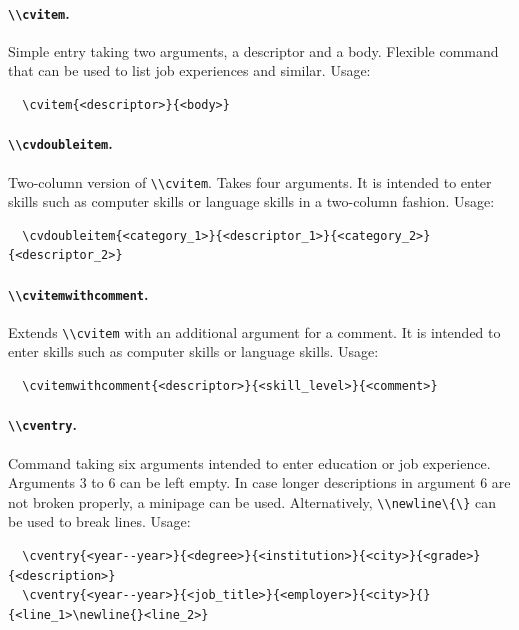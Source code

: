 \documentclass[a4paper, 11pt]{article}
\newcommand{\code}[1]{\lstinline!#1!}
\begin{document}
\paragraph{\code{\\cvitem}.}
Simple entry taking two arguments, a descriptor and a body.
Flexible command that can be used to list job experiences and similar.
Usage:
\begin{lstlisting}
  \cvitem{<descriptor>}{<body>}
\end{lstlisting}

\paragraph{\code{\\cvdoubleitem}.}
Two-column version of \code{\\cvitem}.
Takes four arguments.
It is intended to enter skills such as computer skills or language skills in a two-column fashion.
Usage:
\begin{lstlisting}
  \cvdoubleitem{<category_1>}{<descriptor_1>}{<category_2>}{<descriptor_2>}
\end{lstlisting}

\paragraph{\code{\\cvitemwithcomment}.}
Extends \code{\\cvitem} with an additional argument for a comment.
It is intended to enter skills such as computer skills or language skills.
Usage:
\begin{lstlisting}
  \cvitemwithcomment{<descriptor>}{<skill_level>}{<comment>}
\end{lstlisting}

\paragraph{\code{\\cventry}.}
Command taking six arguments intended to enter education or job experience.
Arguments 3 to 6 can be left empty.
In case longer descriptions in argument 6 are not broken properly, a minipage can be used.
Alternatively, \code{\\newline\{\}} can be used to break lines.
Usage:
\begin{lstlisting}
  \cventry{<year--year>}{<degree>}{<institution>}{<city>}{<grade>}{<description>}
  \cventry{<year--year>}{<job_title>}{<employer>}{<city>}{}{<line_1>\newline{}<line_2>}
\end{lstlisting}
\end{document}
